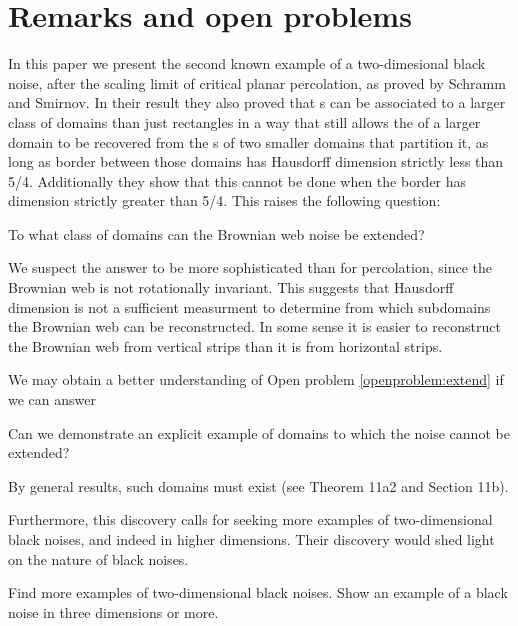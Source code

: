 {
\section{Remarks and open problems}

\label{sec:open-problems}

In this paper we present the second known example of a two-dimesional
black noise, after the scaling limit of critical planar percolation,
as proved by Schramm and Smirnov.  In their result they also proved
that \sigfield{}s can be associated to a larger class of domains than
just rectangles in a way that still allows the \sigfield{} of a larger
domain to be recovered from the \sigfield{}s of two smaller domains
that partition it, as long as border between those domains has
Hausdorff dimension strictly less than 5/4.
Additionally they show that this cannot be done when the border has
dimension strictly greater than 5/4.
This raises the following question:

\begin{openproblem}
  \label{openproblem:extend}
  To what class of domains can the Brownian web noise be extended?
\end{openproblem}

We suspect the answer to be more sophisticated than for percolation,
since the Brownian web is not rotationally invariant.  
This suggests that Hausdorff dimension is not a sufficient measurment
to determine from which subdomains the Brownian web can be
reconstructed.  In some sense it is easier to reconstruct the Brownian
web from vertical strips than it is from horizontal strips.

We may obtain a better understanding of Open problem
\ref{openproblem:extend} if we can answer

\begin{openproblem}
  Can we demonstrate an explicit example of domains to which the noise
  cannot be extended?
\end{openproblem}

By general results, such domains must exist (see
\cite{tsirelson-nonclassical-stochastic-flows} Theorem 11a2 and
Section 11b).

Furthermore, this discovery calls for seeking more examples of
two-dimen\-sional black noises, and indeed in higher dimensions.  Their
discovery would shed light on the nature of black noises.

\begin{openproblem}
  Find more examples of two-dimensional black noises.  Show an example
  of a black noise in three dimensions or more.
\end{openproblem}
}
